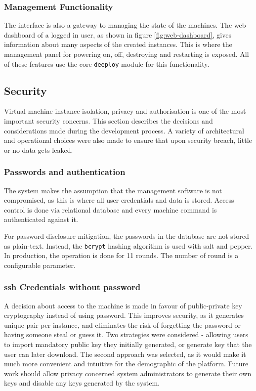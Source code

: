 \documentclass{article}
\begin{document}
\subsubsection{Management Functionality}
The interface is also a gateway to managing the state of the
machines. The web dashboard of a logged in user, as shown in figure \ref{fig:web-dashboard}, gives information about many aspects of the created instances. This is where the management panel for powering on, off, destroying and restarting is exposed. All of these features use the core \texttt{deeploy} module for this functionality.

\subsection{Security}

Virtual machine instance isolation, privacy and authorisation is one of the most important security concerns. This section describes the decisions and considerations made during the development process. A variety of architectural and operational choices were also made to ensure that upon security breach, little or no data gets leaked.

\subsubsection{Passwords and authentication}
\label{Passwords and authentication}
The system makes the assumption that the management software is not compromised, as this is where all user credentials and data is stored.
Access control is done via relational database and every machine command is authenticated against it.

For password disclosure mitigation, the passwords in the database are not stored as plain-text. Instead, the \texttt{bcrypt} hashing algorithm is used with salt and pepper. In production, the operation is done for 11 rounds. The number of round is a configurable parameter.

\subsubsection{\gls{ssh} Credentials without password}
A decision about access to the machine is made in favour of public-private key cryptography instead of using password. This improves security, as it generates unique pair per instance, and eliminates the risk of forgetting the password or having someone steal or guess it.
Two strategies were considered - allowing users to import mandatory public key they initially generated, or generate key that the user can later download. The second approach was selected, as it would make it much more convenient and intuitive for the demographic of the platform. Future work should allow privacy concerned system administrators to generate their own keys and disable any keys generated by the system.
\end{document}
